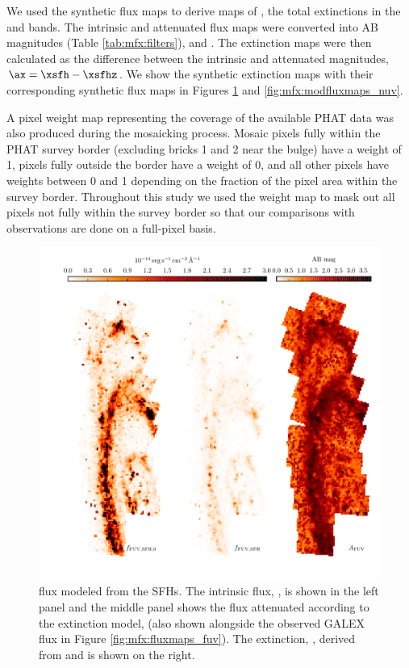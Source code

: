 We used the synthetic flux maps to derive maps of \ax{}, the total extinctions
in the \fuv{} and \nuv{} bands. The intrinsic and attenuated flux maps were
converted into AB magnitudes (Table \ref{tab:mfx:filters}), \xsfhz{} and
\xsfh{}. The extinction maps were then calculated as the difference between the
intrinsic and attenuated magnitudes, $\ax = \xsfh - \xsfhz$. We show the
synthetic extinction maps with their corresponding synthetic flux maps in
Figures \ref{fig:mfx:modfluxmaps_fuv} and \ref{fig:mfx:modfluxmaps_nuv}.

A pixel weight map representing the coverage of the available PHAT data was
also produced during the mosaicking process. Mosaic pixels fully within the
PHAT survey border (excluding bricks 1 and 2 near the bulge) have a weight of
1, pixels fully outside the border have a weight of 0, and all other pixels
have weights between 0 and 1 depending on the fraction of the pixel area within
the survey border. Throughout this study we used the weight map to mask out all
pixels not fully within the survey border so that our comparisons with
observations are done on a full-pixel basis.


\begin{figure}
\centering
\includegraphics[width=\textwidth]{m31flux-figures/modfluxmaps_fuv.pdf}
\caption[\fuv{} flux map modeled from the SFHs.]{\fuv{} flux modeled from the SFHs.
    The intrinsic flux, \ffuvsfhz{}, is shown in the left panel and the middle
    panel shows the flux attenuated according to the extinction model, \ffuvsfh{}
    (also shown alongside the observed GALEX \fuv{} flux in Figure
    \ref{fig:mfx:fluxmaps_fuv}). The \fuv{} extinction, \afuv{}, derived from
    \ffuvsfhz{} and \ffuvsfh{} is shown on the right.
}
\label{fig:mfx:modfluxmaps_fuv}
\end{figure}


